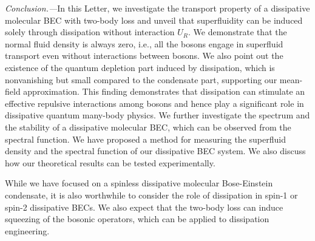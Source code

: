 \documentclass[aps,prl,twocolumn,superscriptaddress,]{revtex4-1}
\begin{document}



\emph{Conclusion.---}In this Letter, we investigate the
transport property of a dissipative molecular BEC with two-body loss and
unveil that superfluidity can be induced solely through dissipation
without interaction $U_{R}$. 
We demonstrate that the normal fluid density is always zero, i.e., all the bosons engage in superfluid transport even without interactions between bosons. We also point out the existence of the quantum depletion part induced by dissipation, which is nonvanishing but small compared to the condensate part, supporting our mean-field approximation. This finding demonstrates that dissipation can stimulate an effective repulsive interactions among
bosons and hence play a significant role in dissipative
quantum many-body physics. We further investigate the spectrum and the stability of a dissipative molecular BEC, which can be observed from the spectral function. %
We have proposed
a method for measuring the superfluid density and the spectral function
of our dissipative BEC system. We also discuss how our theoretical results can be tested experimentally.

While we have focused on a spinless dissipative molecular Bose-Einstein condensate, it is also worthwhile to consider the role of dissipation in spin-1 or spin-2 dissipative BECs. We also expect that the two-body loss can induce squeezing of the bosonic operators, which can be applied to dissipation engineering.
\end{document}
